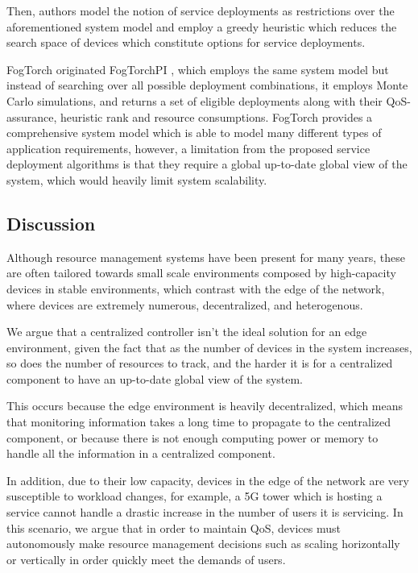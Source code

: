 Then, authors model the notion of service deployments as restrictions over the aforementioned system model and employ a greedy heuristic which reduces the search space of devices which constitute options for service deployments.

FogTorch originated FogTorchPI \cite{brogi2017best}, which employs the same system model but instead of searching over all possible deployment combinations, it employs Monte Carlo simulations, and returns a set of eligible deployments along with their QoS-assurance, heuristic rank and resource consumptions. FogTorch provides a comprehensive system model which is able to model many different types of application requirements, however, a limitation from the proposed service deployment algorithms is that they require a global up-to-date global view of the system, which would heavily limit system scalability.

\subsection{Discussion}

Although resource management systems have been present for many years, these are often tailored towards small scale environments composed by high-capacity devices in stable environments, which contrast with the edge of the network, where devices are extremely numerous, decentralized, and heterogenous.

We argue that a centralized controller isn't the ideal solution for an edge environment, given the fact that as the number of devices in the system increases, so does the number of resources to track, and the harder it is for a centralized component to have an up-to-date global view of the system. 

This occurs because the edge environment is heavily decentralized, which means that monitoring information takes a long time to propagate to the centralized component, or because there is not enough computing power or memory to handle all the information in a centralized component.

In addition, due to their low capacity, devices in the edge of the network are very susceptible to workload changes, for example, a 5G tower which is hosting a service cannot handle a drastic increase in the number of users it is servicing. In this scenario, we argue that in order to maintain QoS, devices must autonomously make resource management decisions such as scaling horizontally or vertically in order quickly meet the demands of users.

